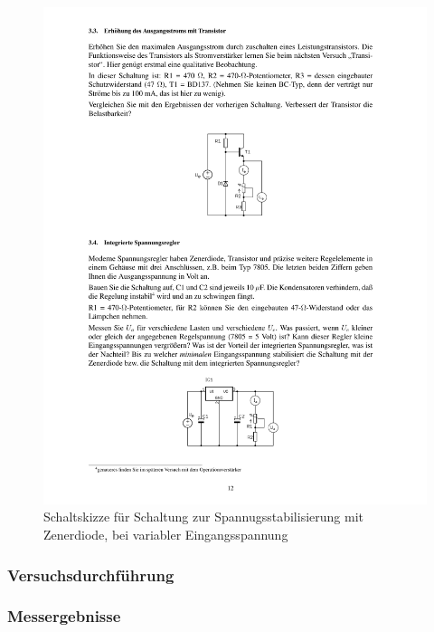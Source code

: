 \documentclass[12pt,a4paper]{article}
\begin{document}
\begin{figure}[H] 
  \centering
    \includegraphics[trim = 10mm 30mm 10mm 205mm, clip, scale = 1]{ep2_14[Page12].pdf}
  	\caption[Schaltskizze für Schaltung zur Spannugsstabilisierung mit Zenerdiode, bei variabler Eingangsspannung]{Schaltskizze für Schaltung zur Spannugsstabilisierung mit Zenerdiode, bei variabler Eingangsspannung\footnotemark}
  \label{fig:2_11}
\end{figure}

\subsubsection{Versuchsdurchführung}

\subsubsection{Messergebnisse}
\end{document}
